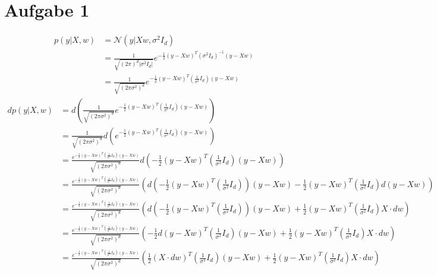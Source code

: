 \documentclass[10pt,a4paper]{article}
\begin{document}
\section{Aufgabe 1}

\begin{align*}
  p(y | X, w) & = \mathcal{N}(y | Xw, \sigma^{2} I_{d})\\
  & = \frac{1}{\sqrt{(2 \pi)^{d} |\sigma^{2} I_{d}|}} e^{-\frac{1}{2}(y - Xw)^{T}(\sigma^{2} I_{d})^{-1}(y - Xw)}\\
  & = \frac{1}{\sqrt{(2 \pi \sigma^{2})^{d}}} e^{-\frac{1}{2}(y - Xw)^{T}(\frac{1}{\sigma^{2}} I_{d})(y - Xw)}
\end{align*}
\begin{align*}
  dp(y | X, w) & = d \left(\frac{1}{\sqrt{(2 \pi \sigma^{2})^{d}}} e^{-\frac{1}{2}(y - Xw)^{T}(\frac{1}{\sigma^{2}} I_{d})(y - Xw)} \right)\\
               & = \frac{1}{\sqrt{(2 \pi \sigma^{2})^{d}}} d \left(e^{-\frac{1}{2}(y - Xw)^{T}(\frac{1}{\sigma^{2}} I_{d})(y - Xw)} \right)\\
               & = \frac{e^{-\frac{1}{2}(y - Xw)^{T}(\frac{1}{\sigma^{2}} I_{d})(y - Xw)}}{\sqrt{(2 \pi \sigma^{2})^{d}}} d \left(-\frac{1}{2}(y - Xw)^{T}(\frac{1}{\sigma^{2}} I_{d})(y - Xw) \right)\\
               & = \frac{e^{-\frac{1}{2}(y - Xw)^{T}(\frac{1}{\sigma^{2}} I_{d})(y - Xw)}}{\sqrt{(2 \pi \sigma^{2})^{d}}} \left( d \left(-\frac{1}{2}(y - Xw)^{T}(\frac{1}{\sigma^{2}} I_{d}) \right)(y - Xw) - \frac{1}{2}(y - Xw)^{T}(\frac{1}{\sigma^{2}} I_{d}) d(y - Xw) \right)\\
               & = \frac{e^{-\frac{1}{2}(y - Xw)^{T}(\frac{1}{\sigma^{2}} I_{d})(y - Xw)}}{\sqrt{(2 \pi \sigma^{2})^{d}}} \left( d \left(-\frac{1}{2}(y - Xw)^{T}(\frac{1}{\sigma^{2}} I_{d}) \right)(y - Xw) + \frac{1}{2}(y - Xw)^{T}(\frac{1}{\sigma^{2}} I_{d}) X \cdot dw \right)\\
               & = \frac{e^{-\frac{1}{2}(y - Xw)^{T}(\frac{1}{\sigma^{2}} I_{d})(y - Xw)}}{\sqrt{(2 \pi \sigma^{2})^{d}}} \left( -\frac{1}{2} d(y - Xw)^{T} (\frac{1}{\sigma^{2}} I_{d})(y - Xw) + \frac{1}{2}(y - Xw)^{T}(\frac{1}{\sigma^{2}} I_{d}) X \cdot dw \right)\\
               & = \frac{e^{-\frac{1}{2}(y - Xw)^{T}(\frac{1}{\sigma^{2}} I_{d})(y - Xw)}}{\sqrt{(2 \pi \sigma^{2})^{d}}} \left( \frac{1}{2} (X \cdot dw)^{T} (\frac{1}{\sigma^{2}} I_{d})(y - Xw) + \frac{1}{2}(y - Xw)^{T}(\frac{1}{\sigma^{2}} I_{d}) X \cdot dw \right)\\

\end{align*}
\end{document}
